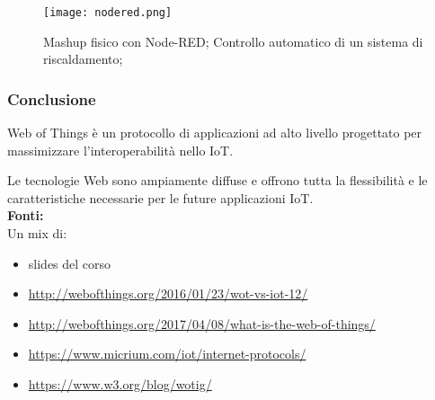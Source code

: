 \begin{figure}[H]
  \centering
  \texttt{[image: nodered.png]}
  \caption{Mashup fisico con Node-RED;
Controllo automatico di un sistema di riscaldamento;}
  \label{fig:nodered}
\end{figure}

\subsubsection{Conclusione}

Web of Things è un protocollo di applicazioni ad alto livello progettato per
massimizzare l'interoperabilità nello IoT.

Le tecnologie Web sono ampiamente diffuse e offrono tutta la flessibilità e le
caratteristiche necessarie per le future applicazioni IoT. \\

\textbf{Fonti:}\\

Un mix di:

\begin{itemize}
  \item slides del corso
  \item \url{http://webofthings.org/2016/01/23/wot-vs-iot-12/}
  \item \url{http://webofthings.org/2017/04/08/what-is-the-web-of-things/}
  \item \url{https://www.micrium.com/iot/internet-protocols/}
  \item \url{https://www.w3.org/blog/wotig/}
\end{itemize}
